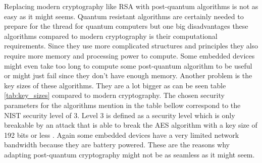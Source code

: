 Replacing modern cryptography like RSA with post-quantum algorithms is not as easy as it might seems. Quantum resistant algorithms are certainly needed to prepare for the thread for quantum computers but one big disadvantages these algorithms compared to modern cryptography is their computational requirements. Since they use more complicated structures and principles they also require more memory and processing power to compute. Some embedded devices might even take too long to compute some post-quantum algorithm to be useful or might just fail since they don't have enough memory. Another problem is the key sizes of these algorithms. They are a lot bigger as can be seen table \ref{tab:key_sizes} compared to modern cryptography. The chosen security parameters for the algorithms mention in the table bellow correspond to the NIST security level of 3. Level 3 is defined as a security level which is only breakable by an attack that is able to break the AES algorithm with a key size of 192 bits or less \cite{8lV5dQrQyshiCp3i}.  Again some embedded devices have a very limited network bandwidth  because they are battery powered. These are the reasons why adapting post-quantum cryptography might not be as seamless as it might seem.

